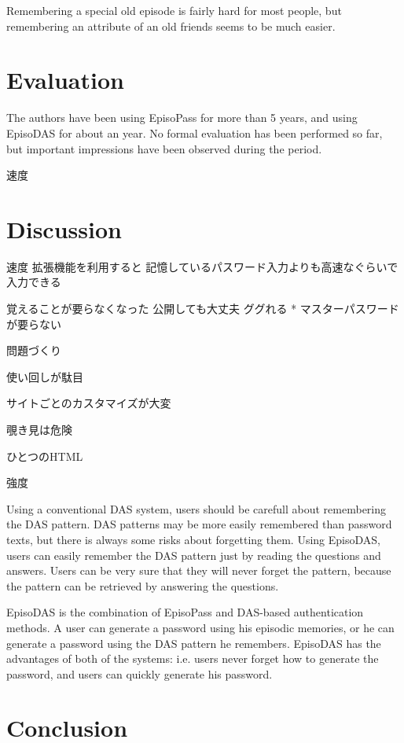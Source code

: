 \documentclass[sigconf]{acmart}
\begin{document}
Remembering a special old episode is fairly hard for most people, but
remembering an attribute of an old friends seems to be much easier.

\section{Evaluation}

The authors have been using EpisoPass for more than 5 years, and
using EpisoDAS for about an year.
No formal evaluation has been performed so far, but
important impressions have been observed during the period.

速度

\section{Discussion}

速度
拡張機能を利用すると
記憶しているパスワード入力よりも高速なぐらいで入力できる


覚えることが要らなくなった
公開しても大丈夫
  ググれる
* マスターパスワードが要らない

問題づくり

使い回しが駄目

サイトごとのカスタマイズが大変

覗き見は危険

ひとつのHTML

強度



Using a conventional DAS system, users should be carefull about
remembering the DAS pattern.
DAS patterns may be more easily remembered than password texts,
but there is always some risks about forgetting them.
Using EpisoDAS, users can easily remember the DAS pattern
just by reading the questions and answers.
Users can be very sure that they will never forget the pattern,
because the pattern can be retrieved by answering the questions.


EpisoDAS is the combination of EpisoPass and DAS-based authentication methods.
A user can generate a password using his episodic memories, or
he can generate a password using the DAS pattern he remembers.
%
EpisoDAS has the advantages of both of the systems: i.e.
users never forget how to generate the password, and
users can quickly generate his password.

\section{Conclusion}


% 

\end{document}
